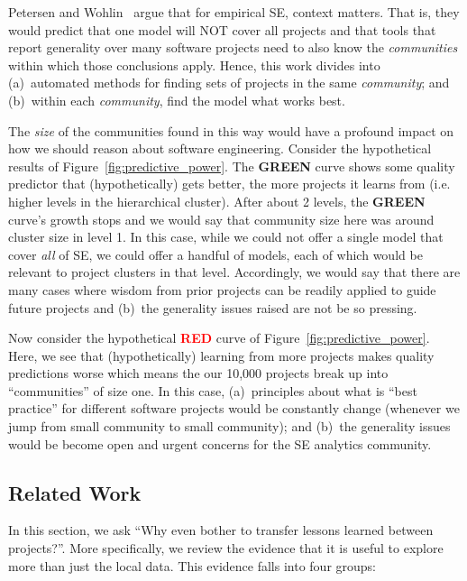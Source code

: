 \documentclass[sigconf]{acmart}
\theoremstyle{break}
\begin{document}
Petersen and Wohlin~\cite{Petersen2009} argue that for empirical SE, context matters.
That is, they would predict that one model  will NOT  cover all  projects and that tools that report  generality  over many software projects need to also know the {\em communities} within which those conclusions   apply. Hence, this work divides into (a)~automated methods for finding sets of projects in the same {\em community}; and (b)~within each {\em community}, find the model what works best. 

The {\em size} of the communities found in this way would have a profound impact on how we should reason about software engineering. Consider the hypothetical results of Figure~\ref{fig:predictive_power}. 
The \textcolor{ao(english)}{{\bf GREEN}} curve shows
some quality predictor that (hypothetically) gets better, the more projects it learns from (i.e. higher levels in the hierarchical cluster). After about 2 levels, the \textcolor{ao(english)}{{\bf GREEN}} curve's growth stops and we would say that community size here was around cluster size in level 1. In this case, while we could not offer a single model that cover {\em all} of SE, we could offer a handful of models, each of which would be relevant to project clusters in that level. Accordingly, we would say that there are many cases where  wisdom from prior projects can be readily applied to guide future projects and (b)~the generality issues raised are not be so pressing.

Now consider the hypothetical \textcolor{red}{{\bf RED}} curve of 
Figure~\ref{fig:predictive_power}. Here, we see that (hypothetically)  learning from more projects makes quality predictions worse which means the our 10,000 projects break up into ``communities'' of size one.
In this case,  (a)~principles about what is ``best practice'' for different software projects
would be constantly change (whenever we jump from small community to small community);
and (b)~the generality issues would be become open and urgent concerns for the SE analytics community.


\subsection{Related Work}
\label{sec:related}

In this section, we ask ``Why even bother to transfer lessons learned between projects?''. More specifically, we review the evidence that  it is useful to explore more than just the local data. This evidence falls into four groups:
\end{document}
